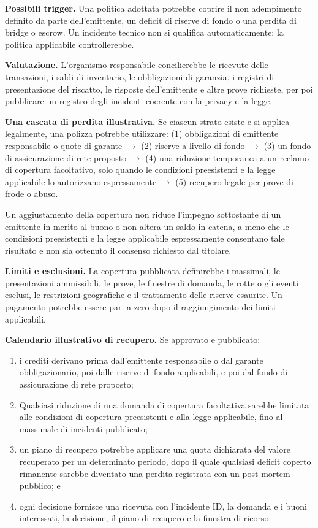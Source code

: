 \documentclass[11pt]{article}
\begin{document}
\textbf{Possibili trigger.} Una politica adottata potrebbe coprire il non adempimento definito da parte dell'emittente, un deficit di riserve di fondo o una perdita di bridge o escrow. Un incidente tecnico non si qualifica automaticamente; la politica applicabile controllerebbe.

\textbf{Valutazione.} L'organismo responsabile concilierebbe le ricevute delle transazioni, i saldi di inventario, le obbligazioni di garanzia, i registri di presentazione del riscatto, le risposte dell'emittente e altre prove richieste, per poi pubblicare un registro degli incidenti coerente con la privacy e la legge.

\textbf{Una cascata di perdita illustrativa.} Se ciascun strato esiste e si applica legalmente, una polizza potrebbe utilizzare: (1) obbligazioni di emittente responsabile o quote di garante $\to$ (2) riserve a livello di fondo $\to$ (3) un fondo di assicurazione di rete proposto $\to$ (4) una riduzione temporanea a un reclamo di copertura facoltativo, solo quando le condizioni preesistenti e la legge applicabile lo autorizzano espressamente $\to$ (5) recupero legale per prove di frode o abuso.

Un aggiustamento della copertura non riduce l'impegno sottostante di un emittente in merito al buono o non altera un saldo in catena, a meno che le condizioni preesistenti e la legge applicabile espressamente consentano tale risultato e non sia ottenuto il consenso richiesto dal titolare.

\textbf{Limiti e esclusioni.} La copertura pubblicata definirebbe i massimali, le presentazioni ammissibili, le prove, le finestre di domanda, le rotte o gli eventi esclusi, le restrizioni geografiche e il trattamento delle riserve esaurite. Un pagamento potrebbe essere pari a zero dopo il raggiungimento dei limiti applicabili.

\textbf{Calendario illustrativo di recupero.} Se approvato e pubblicato:

\begin{enumerate}[leftmargin=*]
\item i crediti derivano prima dall'emittente responsabile o dal garante obbligazionario, poi dalle riserve di fondo applicabili, e poi dal fondo di assicurazione di rete proposto;
\item Qualsiasi riduzione di una domanda di copertura facoltativa sarebbe limitata alle condizioni di copertura preesistenti e alla legge applicabile, fino al massimale di incidenti pubblicato;
\item un piano di recupero potrebbe applicare una quota dichiarata del valore recuperato per un determinato periodo, dopo il quale qualsiasi deficit coperto rimanente sarebbe diventato una perdita registrata con un post mortem pubblico; e
\item ogni decisione fornisce una ricevuta con l'incidente ID, la domanda e i buoni interessati, la decisione, il piano di recupero e la finestra di ricorso.
\end{enumerate}
\end{document}
